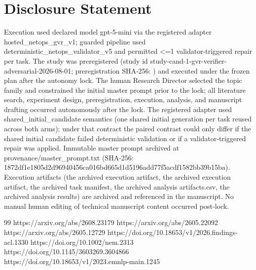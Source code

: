 \documentclass[conference]{IEEEtran}
\begin{document}
\section*{Disclosure Statement}
Execution used declared model gpt-5-mini via the registered adapter hosted\_netops\_gvr\_v1; guarded pipeline used deterministic\_netops\_validator\_v5 and permitted <=1 validator‑triggered repair per task. The study was preregistered (study id study-cand-1-gvr-verifier-adversarial-2026-08-01; preregistration SHA‑256: ) and executed under the frozen plan after the autonomy lock. The human Research Director selected the topic family and constrained the initial master prompt prior to the lock; all literature search, experiment design, preregistration, execution, analysis, and manuscript drafting occurred autonomously after the lock. The registered adapter used shared\_initial\_candidate semantics (one shared initial generation per task reused across both arms); under that contract the paired contrast could only differ if the shared initial candidate failed deterministic validation or if a validator‑triggered repair was applied. Immutable master prompt archived at provenance/master\_prompt.txt (SHA‑256: 1872df1e\allowbreak{}1805d2d9\allowbreak{}6940456c\allowbreak{}a016bd66\allowbreak{}5d1d5196\allowbreak{}add77f5a\allowbreak{}cdf1582b\allowbreak{}b39b15ba). Execution artifacts (the archived execution artifact, the archived execution artifact, the archived task manifest, the archived analysis artifacts.csv, the archived analysis results) are archived and referenced in the manuscript. No manual human editing of technical manuscript content occurred post‑lock.

\begin{thebibliography}{99}
 https://arxiv.org/abs/2608.23179
 https://arxiv.org/abs/2605.22092
 https://arxiv.org/abs/2605.12729
 https://doi.org/10.18653/v1/2026.findings-acl.1330
 https://doi.org/10.1002/nem.2313
 https://doi.org/10.1145/3603269.3604866
 https://doi.org/10.18653/v1/2023.emnlp-main.1245
\end{thebibliography}
\end{document}
